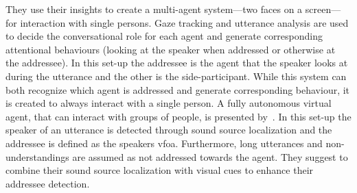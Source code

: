 They use their insights to create a multi-agent  system---two faces on a screen---for interaction with single persons.
Gaze tracking and utterance analysis are used to decide the \gls{conversational role} for each agent and generate corresponding attentional behaviours (looking at the \gls{speaker} when addressed or otherwise at the \gls{addressee}).
In this set-up the \gls{addressee} is the agent that the \gls{speaker} looks at during the utterance and the other is the \gls{side-participant}.
While this system can both recognize which agent is addressed and generate corresponding behaviour, it is created to always interact with a single person.
A fully autonomous \gls{virtual agent}, that can interact with groups of people, is presented by~.
In this set-up the \gls{speaker} of an utterance is detected through sound source localization and the \gls{addressee} is defined as the \glspl{speaker} \gls{vfoa}.
Furthermore, long utterances and non-understandings are assumed as not addressed towards the agent.
They suggest to combine their sound source localization with visual cues to enhance their addressee detection.

